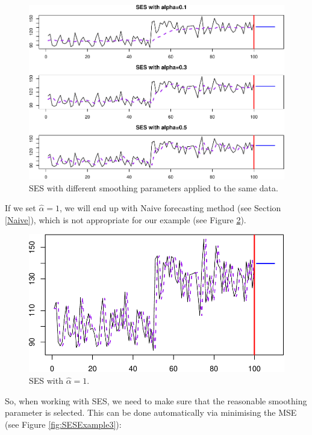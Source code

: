 \documentclass[
]{book}
\theoremstyle{definition}
\theoremstyle{definition}
\theoremstyle{definition}
\theoremstyle{definition}
\theoremstyle{remark}
\begin{document}
\begin{figure}
\centering
\includegraphics{Svetunkov--2022----ADAM_files/figure-latex/SESExamples-1.pdf}
\caption{\label{fig:SESExamples}SES with different smoothing parameters applied to the same data.}
\end{figure}

If we set \(\hat{\alpha}=1\), we will end up with Naive forecasting method (see Section \ref{Naive}), which is not appropriate for our example (see Figure \ref{fig:SESExampleNaive}).

\begin{figure}
\centering
\includegraphics{Svetunkov--2022----ADAM_files/figure-latex/SESExampleNaive-1.pdf}
\caption{\label{fig:SESExampleNaive}SES with \(\hat{\alpha}=1\).}
\end{figure}

So, when working with SES, we need to make sure that the reasonable smoothing parameter is selected. This can be done automatically via minimising the MSE (see Figure \ref{fig:SESExample3}):
\end{document}
